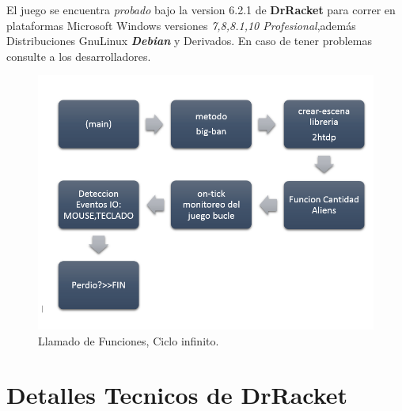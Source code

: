 \documentclass[a4paper]{article} %
\begin{document}
El juego se encuentra \emph{probado} bajo la version 6.2.1 de \textbf{DrRacket} para correr en plataformas Microsoft Windows versiones \textit{ 7,8,8.1,10 Profesional},además  Distribuciones Gnu\/Linux \textbf{\textit{Debian}} y Derivados.
En caso de tener problemas consulte a los desarrolladores.
\begin{figure}
  \centering
    \includegraphics[scale=0.6]{images/smart}
  \caption{Llamado de Funciones, Ciclo infinito.}
  \label{fig:smart}
\end{figure}

\newpage
\section{Detalles Tecnicos de  DrRacket}
\label{sec:detecnicos}
\end{document}
